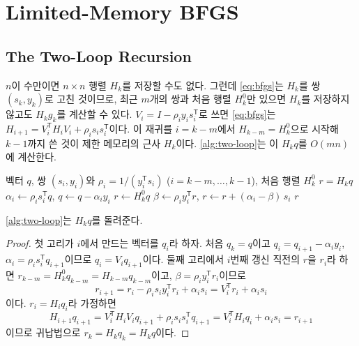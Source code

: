\section{Limited-Memory BFGS}
\label{sec:lbfgs}

\subsection{The Two-Loop Recursion}

$n$이 수만이면 $n\times n$ 행렬 $H_k$를 저장할 수도 없다. 그런데 \eqref{eq:bfgs}는 $H_k$를 쌍 $(s_k,y_k)$로 고친 것이므로, 최근 $m$개의 쌍과 처음 행렬 $H_k^0$만 있으면 $H_k$를 저장하지 않고도 $H_kg_k$를 계산할 수 있다. $V_i=I-\rho_iy_is_i^{\mathsf T}$로 쓰면 \eqref{eq:bfgs}는 $H_{i+1}=V_i^{\mathsf T}H_iV_i+\rho_is_is_i^{\mathsf T}$이다. 이 재귀를 $i=k-m$에서 $H_{k-m}=H_k^0$으로 시작해 $k-1$까지 쓴 것이 제한 메모리의 근사 $H_k$이다. \cref{alg:two-loop}는 이 $H_kq$를 $O(mn)$에 계산한다\cite{nocedal1980}.

\begin{algorithm}[t]
\begin{algorithmic}[1]
\Require 벡터 $q$, 쌍 $(s_i,y_i)$와 $\rho_i=1/(y_i^{\mathsf T}s_i)$ ($i=k-m,\dots,k-1$), 처음 행렬 $H_k^0$
\Ensure $r=H_kq$
 
  \State $\alpha_i\gets\rho_is_i^{\mathsf T}q$, $q\gets q-\alpha_iy_i$
\EndFor
\State $r\gets H_k^0q$
 
  \State $\beta\gets\rho_iy_i^{\mathsf T}r$, $r\gets r+(\alpha_i-\beta)\,s_i$
\EndFor
\State \Return $r$
\end{algorithmic}
\caption{L-BFGS의 두 고리 재귀}
\label{alg:two-loop}
\end{algorithm}

\begin{proposition}
\cref{alg:two-loop}는 $H_kq$를 돌려준다.
\end{proposition}

\begin{proof}
첫 고리가 $i$에서 만드는 벡터를 $q_i$라 하자. 처음 $q_k=q$이고 $q_i=q_{i+1}-\alpha_iy_i$, $\alpha_i=\rho_is_i^{\mathsf T}q_{i+1}$이므로 $q_i=V_iq_{i+1}$이다. 둘째 고리에서 $i$번째 갱신 직전의 $r$을 $r_i$라 하면 $r_{k-m}=H_k^0q_{k-m}=H_{k-m}q_{k-m}$이고, $\beta=\rho_iy_i^{\mathsf T}r_i$이므로
\[
r_{i+1}=r_i-\rho_is_iy_i^{\mathsf T}r_i+\alpha_is_i=V_i^{\mathsf T}r_i+\alpha_is_i
\]
이다. $r_i=H_iq_i$라 가정하면
\[
H_{i+1}q_{i+1}=V_i^{\mathsf T}H_iV_iq_{i+1}+\rho_is_is_i^{\mathsf T}q_{i+1}=V_i^{\mathsf T}H_iq_i+\alpha_is_i=r_{i+1}
\]
이므로 귀납법으로 $r_k=H_kq_k=H_kq$이다.
\end{proof}

